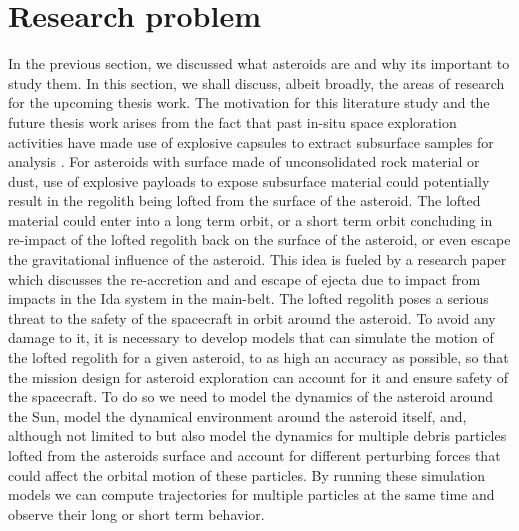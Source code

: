 \section{Research problem}
In the previous section, we discussed what asteroids are and why its important to study them. In this section, we shall discuss, albeit broadly, the areas of research for the upcoming thesis work. The motivation for this literature study and the future thesis work arises from the fact that past in-situ space exploration activities have made use of explosive capsules to extract subsurface samples for analysis \cite{hayabusa2}. For asteroids with surface made of unconsolidated rock material or dust, use of explosive payloads to expose subsurface material could potentially result in the regolith being lofted from the surface of the asteroid. The lofted material could enter into a long term orbit, or a short term orbit concluding in re-impact of the lofted regolith back on the surface of the asteroid, or even escape the gravitational influence of the asteroid. This idea is fueled by a research paper \cite{idaEjectaErosion} which discusses the re-accretion and and escape of ejecta due to impact from impacts in the Ida system in the main-belt. The lofted regolith poses a serious threat to the safety of the spacecraft in orbit around the asteroid. To avoid any damage to it, it is necessary to develop models that can simulate the motion of the lofted regolith for a given asteroid, to as high an accuracy as possible, so that the mission design for asteroid exploration can account for it and ensure safety of the spacecraft. To do so we need to model the dynamics of the asteroid around the Sun, model the dynamical environment around the asteroid itself, and, although not limited to but also model the dynamics for multiple debris particles lofted from the asteroids surface and account for different perturbing forces that could affect the orbital motion of these particles. By running these simulation models we can compute trajectories for multiple particles at the same time and observe their long or short term behavior.

